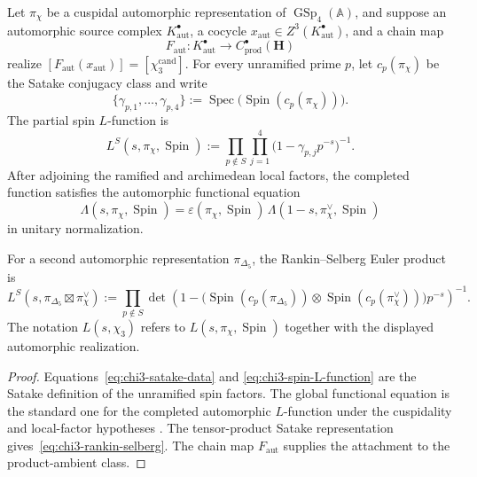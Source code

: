 \begin{theorem}
\label{thm:chi3-L-function-andrianov-kalinin}
\ClaimStatusConditional
Let \(\pi_{\chi}\) be a cuspidal automorphic representation of
\(\operatorname{GSp}_4(\mathbb A)\), and suppose an automorphic source
complex \(K^\bullet_{\mathrm{aut}}\), a cocycle
\(x_{\mathrm{aut}}\in Z^3(K^\bullet_{\mathrm{aut}})\), and a chain map
\[
 F_{\mathrm{aut}}\colon K^\bullet_{\mathrm{aut}}
 \longrightarrow C^\bullet_{\mathrm{prod}}(\mathbf H)
\]
realize
\([F_{\mathrm{aut}}(x_{\mathrm{aut}})]
 =[\chi_3^{\mathrm{cand}}]\).
For every unramified prime \(p\), let \(c_p(\pi_\chi)\) be the Satake
conjugacy class and write
\begin{equation}
\label{eq:chi3-satake-data}
 \{\gamma_{p,1},\ldots,\gamma_{p,4}\}
 :=\operatorname{Spec}\!
 \bigl(\operatorname{Spin}(c_p(\pi_\chi))\bigr).
\end{equation}
The partial spin \(L\)-function is
\begin{equation}
\label{eq:chi3-spin-L-function}
 L^S(s,\pi_\chi,\operatorname{Spin})
 :=
 \prod_{p\notin S}\prod_{j=1}^{4}
 \bigl(1-\gamma_{p,j}p^{-s}\bigr)^{-1}.
\end{equation}
After adjoining the ramified and archimedean local factors, the
completed function satisfies the automorphic functional equation
\begin{equation}
\label{eq:chi3-functional-equation}
 \Lambda(s,\pi_\chi,\operatorname{Spin})
 =
 \varepsilon(\pi_\chi,\operatorname{Spin})\,
 \Lambda(1-s,\pi_\chi^\vee,\operatorname{Spin})
\end{equation}
in unitary normalization.

For a second automorphic representation \(\pi_{\Delta_5}\), the
Rankin--Selberg Euler product is
\begin{equation}
\label{eq:chi3-rankin-selberg}
 L^S(s,\pi_{\Delta_5}\boxtimes\pi_\chi^\vee)
 :=
 \prod_{p\notin S}
 \det\!\left(
  1-
  \bigl(\operatorname{Spin}(c_p(\pi_{\Delta_5}))
  \otimes\operatorname{Spin}(c_p(\pi_\chi^\vee))\bigr)p^{-s}
 \right)^{-1}.
\end{equation}
The notation \(L(s,\chi_3)\) refers to
\(L(s,\pi_\chi,\operatorname{Spin})\) together with the displayed
automorphic realization.
\end{theorem}

\begin{proof}
Equations~\eqref{eq:chi3-satake-data} and
\eqref{eq:chi3-spin-L-function} are the Satake definition of the
unramified spin factors.  The global functional equation is the
standard one for the completed automorphic \(L\)-function under the
cuspidality and local-factor hypotheses
\cite{Andrianov1974,Arthur2013Endoscopic}.  The tensor-product Satake
representation gives~\eqref{eq:chi3-rankin-selberg}.  The chain map
\(F_{\mathrm{aut}}\) supplies the attachment to the product-ambient
class.
\end{proof}

